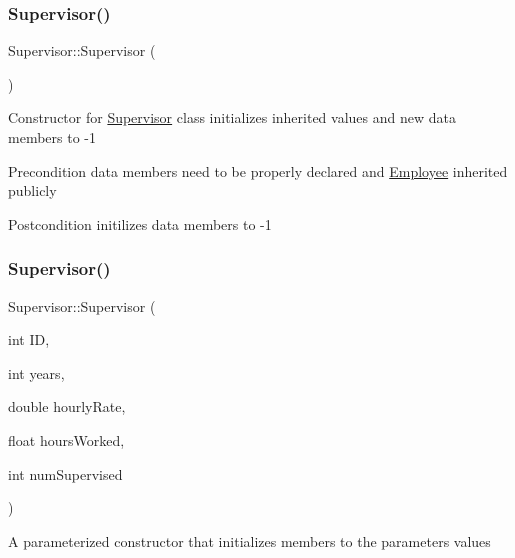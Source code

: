 \subsubsection{\texorpdfstring{Supervisor()}{Supervisor()}\hspace{0.1cm}{\footnotesize\ttfamily [1/2]}}
{\footnotesize\ttfamily Supervisor\+::\+Supervisor (\begin{DoxyParamCaption}{ }\end{DoxyParamCaption})}

Constructor for \hyperlink{classSupervisor}{Supervisor} class initializes inherited values and new data members to -\/1

\begin{DoxyPrecond}{Precondition}
data members need to be properly declared and \hyperlink{classEmployee}{Employee} inherited publicly 
\end{DoxyPrecond}
\begin{DoxyPostcond}{Postcondition}
initilizes data members to -\/1 
\end{DoxyPostcond}
\mbox{\label{classSupervisor_a02d9245744652deb20e9408001d6ed3b}} 
\subsubsection{\texorpdfstring{Supervisor()}{Supervisor()}\hspace{0.1cm}{\footnotesize\ttfamily [2/2]}}
{\footnotesize\ttfamily Supervisor\+::\+Supervisor (\begin{DoxyParamCaption}\item[{int}]{ID,  }\item[{int}]{years,  }\item[{double}]{hourly\+Rate,  }\item[{float}]{hours\+Worked,  }\item[{int}]{num\+Supervised }\end{DoxyParamCaption})}

A parameterized constructor that initializes members to the parameters\textquotesingle{} values


